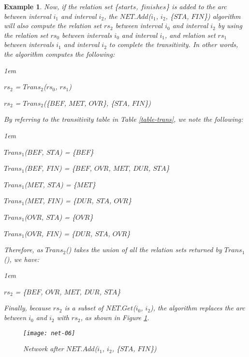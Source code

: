 \documentclass[11pt]{report}
\newtheorem{vexample}{Example}
\newenvironment{vquote}
{
  \begin{list}{}{\leftmargin 1em}\item[]
}
{
  \end{list}
}
\begin{document}
\begin{vexample}
            Now, if the relation set \{$starts$, $finishes$\} is added to the
            arc between interval $i_1$ and interval $i_2$, the $NET.Add$($i_1$,
            $i_2$, \{$STA$, $FIN$\}) algorithm will also compute the relation
            set $rs_2$ between interval $i_0$ and interval $i_2$ by using the
            relation set $rs_0$ between intervals $i_0$ and interval $i_1$, and
            relation set $rs_1$ between intervals $i_1$ and interval $i_2$ to
            complete the transitivity. In other words, the algorithm computes
            the following:

            \begin{vquote}
              $rs_2$ = $Trans_2$($rs_0$, $rs_1$)

              $rs_2$ = $Trans_2$(\{$BEF$, $MET$, $OVR$\}, \{$STA$, $FIN$\})
            \end{vquote}

            By referring to the transitivity table in Table \ref{table-trans},
            we note the following:

            \begin{vquote}
              $Trans_1$($BEF$, $STA$) = \{$BEF$\}

              $Trans_1$($BEF$, $FIN$) = \{$BEF$, $OVR$, $MET$, $DUR$, $STA$\}

              $Trans_1$($MET$, $STA$) = \{$MET$\}

              $Trans_1$($MET$, $FIN$) = \{$DUR$, $STA$, $OVR$\}

              $Trans_1$($OVR$, $STA$) = \{$OVR$\}

              $Trans_1$($OVR$, $FIN$) = \{$DUR$, $STA$, $OVR$\}
            \end{vquote}

            Therefore, as $Trans_2$() takes the union of all the relation sets
            returned by $Trans_1$(), we have:

            \begin{vquote}
              $rs_2$ = \{$BEF$, $OVR$, $MET$, $DUR$, $STA$\}
            \end{vquote}

            Finally, because $rs_2$ is a subset of $NET.Get$($i_0$, $i_2$), the
            algorithm replaces the arc between $i_0$ and $i_2$ with $rs_2$, as
            shown in Figure \ref{fig-net-ex-06}.

            \begin{figure}[[tbhp]
              \begin{center}
                \texttt{[image: net-06]}
                \caption{Network after $NET.Add$($i_1$, $i_2$, \{$STA$, $FIN$\})}
                \label{fig-net-ex-06}
              \end{center}
            \end{figure}
          \end{vexample}
\end{document}
